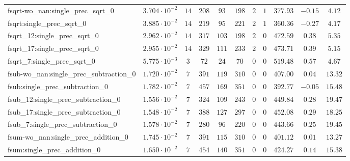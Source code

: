\begin{tabular}{|l|c|c|c|c|c|c|c|c|c|c|}
fsqrt-wo\_nan:single\_prec\_sqrt\_0            & $ 3.704 \cdot 10^{-2} $ & $ 14     $ & $ 208    $ & $ 93    $ & $ 198    $ & $ 2   $ & $ 1 $ & $ 377.93      $ & $ -0.15   $ & $ 4.12    $ \\
fsqrt:single\_prec\_sqrt\_0                    & $ 3.885 \cdot 10^{-2} $ & $ 14     $ & $ 219    $ & $ 95    $ & $ 221    $ & $ 2   $ & $ 1 $ & $ 360.36      $ & $ -0.27   $ & $ 4.17    $ \\
fsqrt\_12:single\_prec\_sqrt\_0                & $ 2.962 \cdot 10^{-2} $ & $ 14     $ & $ 317    $ & $ 103   $ & $ 198    $ & $ 2   $ & $ 0 $ & $ 472.59      $ & $ 0.38    $ & $ 5.35    $ \\
fsqrt\_17:single\_prec\_sqrt\_0                & $ 2.955 \cdot 10^{-2} $ & $ 14     $ & $ 329    $ & $ 111   $ & $ 233    $ & $ 2   $ & $ 0 $ & $ 473.71      $ & $ 0.39    $ & $ 5.15    $ \\
fsqrt\_7:single\_prec\_sqrt\_0                 & $ 5.775 \cdot 10^{-3} $ & $ 3      $ & $ 72     $ & $ 24    $ & $ 70     $ & $ 0   $ & $ 0 $ & $ 519.48      $ & $ 0.57    $ & $ 4.67    $ \\
fsub-wo\_nan:single\_prec\_subtraction\_0      & $ 1.720 \cdot 10^{-2} $ & $ 7      $ & $ 391    $ & $ 119   $ & $ 310    $ & $ 0   $ & $ 0 $ & $ 407.00      $ & $ 0.04    $ & $ 13.32   $ \\
fsub:single\_prec\_subtraction\_0              & $ 1.782 \cdot 10^{-2} $ & $ 7      $ & $ 457    $ & $ 169   $ & $ 351    $ & $ 0   $ & $ 0 $ & $ 392.77      $ & $ -0.05   $ & $ 15.48   $ \\
fsub\_12:single\_prec\_subtraction\_0          & $ 1.556 \cdot 10^{-2} $ & $ 7      $ & $ 324    $ & $ 109   $ & $ 243    $ & $ 0   $ & $ 0 $ & $ 449.84      $ & $ 0.28    $ & $ 19.47   $ \\
fsub\_17:single\_prec\_subtraction\_0          & $ 1.548 \cdot 10^{-2} $ & $ 7      $ & $ 388    $ & $ 127   $ & $ 297    $ & $ 0   $ & $ 0 $ & $ 452.08      $ & $ 0.29    $ & $ 18.25   $ \\
fsub\_7:single\_prec\_subtraction\_0           & $ 1.578 \cdot 10^{-2} $ & $ 7      $ & $ 280    $ & $ 96    $ & $ 220    $ & $ 0   $ & $ 0 $ & $ 443.66      $ & $ 0.25    $ & $ 19.45   $ \\
fsum-wo\_nan:single\_prec\_addition\_0         & $ 1.745 \cdot 10^{-2} $ & $ 7      $ & $ 391    $ & $ 115   $ & $ 310    $ & $ 0   $ & $ 0 $ & $ 401.12      $ & $ 0.01    $ & $ 13.27   $ \\
fsum:single\_prec\_addition\_0                 & $ 1.650 \cdot 10^{-2} $ & $ 7      $ & $ 454    $ & $ 140   $ & $ 351    $ & $ 0   $ & $ 0 $ & $ 424.27      $ & $ 0.14    $ & $ 15.38   $ \\

\end{tabular}

